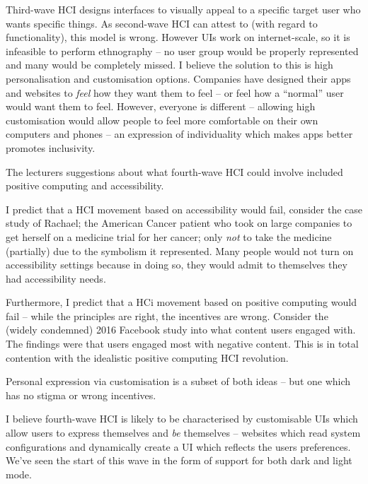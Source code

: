 \documentclass[10pt,\jkfside,a4paper]{article}
\begin{document}
\begin{itemize}
Third-wave HCI designs interfaces to visually appeal to a specific target
user who wants specific things. As second-wave HCI can attest to (with
regard to functionality), this model is wrong. However UIs work on
internet-scale, so it is infeasible to perform ethnography -- no user
group would be properly represented and many would be completely missed. I
believe the solution to this is high personalisation and customisation
options. Companies have designed their apps and websites to \textit{feel}
how they want them to feel -- or feel how a ``normal'' user would want them
to feel. However, everyone is different -- allowing high customisation
would allow people to feel more comfortable on their own computers and
phones -- an expression of individuality which makes apps better promotes
inclusivity.

The lecturers suggestions about what fourth-wave HCI could involve included
positive computing and accessibility.

I predict that a HCI movement based on accessibility would fail, consider
the case study of Rachael; the American Cancer patient who took on large
companies to get herself on a medicine trial for her cancer; only
\textit{not} to take the medicine (partially) due to the symbolism it
represented. Many people would not turn on accessibility settings because in
doing so, they would admit to themselves they had accessibility needs.

Furthermore, I predict that a HCi movement based on positive computing would
fail -- while the principles are right, the incentives are wrong. Consider
the (widely condemned) 2016 Facebook study into what content users engaged
with. The findings were that users engaged most with negative content. This
is in total contention with the idealistic positive computing HCI revolution.

Personal expression via customisation is a subset of both ideas -- but one
which has no stigma or wrong incentives.

I believe fourth-wave HCI is likely to be characterised by customisable UIs
which allow users to express themselves and \textit{be} themselves --
websites which read system configurations and dynamically create a UI which
reflects the users preferences. We've seen the start of this wave in the
form of support for both dark and light mode.

\end{itemize}
\end{document}

